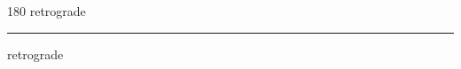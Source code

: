 
\begin{frame}
\begin{center}
\begin{turn}{180}
{\fontsize{2.5cm}{1em}\selectfont retrograde}
\end{turn}
\vspace{1em}\par  
\hrule
\vspace{1em}\par  
{\fontsize{2.5cm}{1em}\selectfont retrograde}
\end{center}
\end{frame}
